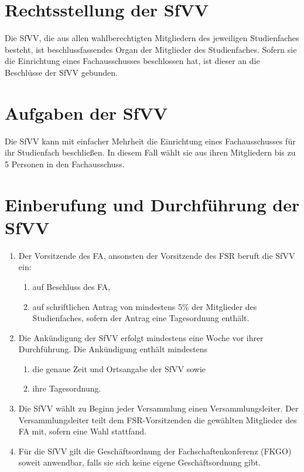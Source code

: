 \documentclass{article}
\begin{document}
\section{Rechtsstellung der SfVV}
Die SfVV, die aus allen wahlberechtigten Mitgliedern des jeweiligen Studienfaches besteht, ist beschlussfassendes Organ der Mitglieder des Studienfaches. Sofern sie die Einrichtung eines Fachausschusses beschlossen hat, ist dieser an die Beschlüsse der SfVV gebunden.

\section{Aufgaben der SfVV}\label{aufgaben-der-sfvv}
Die SfVV kann mit einfacher Mehrheit die Einrichtung eines Fachausschusses für ihr Studienfach beschließen. In diesem Fall wählt sie aus ihren Mitgliedern bis zu 5 Personen in den Fachausschuss.

\section{Einberufung und Durchführung der SfVV}
\begin{enumerate}[(1)]
	\item Der Vorsitzende des FA, ansonsten der Vorsitzende des FSR beruft die SfVV ein:
	\begin{enumerate}[1.]
		\item auf Beschluss des FA,
		\item auf schriftlichen Antrag von mindestens 5\% der Mitglieder des Studienfaches, sofern der Antrag eine Tagesordnung enthält.
	\end{enumerate}
	\item Die Ankündigung der SfVV erfolgt mindestens eine Woche vor ihrer Durchführung. Die Ankündigung enthält mindestens
	\begin{enumerate}[1.]
		\item die genaue Zeit und Ortsangabe der SfVV sowie
		\item ihre Tagesordnung.
	\end{enumerate}
	\item Die SfVV wählt zu Beginn jeder Versammlung einen Versammlungsleiter. Der Versammlungsleiter teilt dem FSR-Vorsitzenden die gewählten Mitglieder des FA mit, sofern eine Wahl stattfand.
	\item Für die SfVV gilt die Geschäftsordnung der Fachschaftenkonferenz (FKGO) soweit anwendbar, falls sie sich keine eigene Geschäftsordnung gibt.
\end{enumerate}
\end{document}
